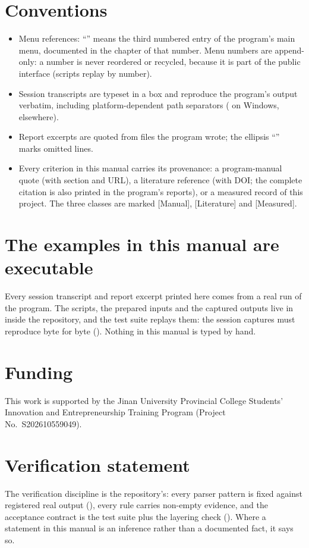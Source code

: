 \section*{Conventions}

\begin{itemize}
  \item Menu references: ``'' means the third numbered entry of the
    program's main menu, documented in the chapter of that number. Menu numbers
    are append-only: a number is never reordered or recycled, because it is
    part of the public interface (scripts replay by number).
  \item Session transcripts are typeset in a box and reproduce the program's
    output verbatim, including platform-dependent path separators
    ( on Windows,  elsewhere).
  \item Report excerpts are quoted from files the program wrote; the ellipsis
    ``'' marks omitted lines.
  \item Every criterion in this manual carries its provenance: a program-manual
    quote (with section and URL), a literature reference (with DOI; the complete
    citation is also printed in the program's reports), or a measured record of
    this project. The three classes are marked \textsf{[Manual]},
    \textsf{[Literature]} and \textsf{[Measured]}.
\end{itemize}

\section*{The examples in this manual are executable}

Every session transcript and report excerpt printed here comes from a real run
of the program. The scripts, the prepared inputs and the captured outputs live
in  inside the repository, and the test suite
replays them: the session captures must reproduce byte for byte
(). Nothing in this manual is typed by hand.

\section*{Funding}

This work is supported by the Jinan University Provincial College Students'
Innovation and Entrepreneurship Training Program (Project No.~S202610559049).

\section*{Verification statement}

The verification discipline is the repository's: every parser pattern is
fixed against registered real output (), every rule carries
non-empty evidence, and the acceptance contract is the test suite plus the
layering check (). Where a statement in this manual
is an inference rather than a documented fact, it says so.
